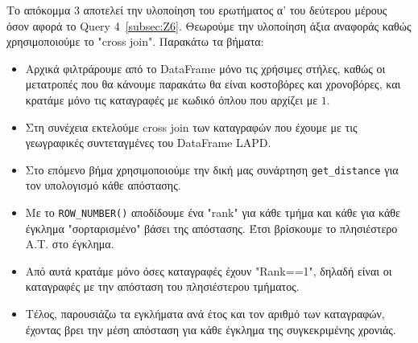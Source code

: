 \documentclass{article}
\begin{document}
Το απόκομμα 3 αποτελεί την υλοποίηση του ερωτήματος α' του δεύτερου μέρους όσον αφορά το Query 4~\ref{subsec:Z6}.  Θεωρούμε την υλοποίηση άξια αναφοράς καθώς χρησιμοποιούμε το  "cross join". Παρακάτω τα βήματα:
\begin{itemize}
    \item   Αρχικά φιλτράρουμε από το  DataFrame μόνο τις χρήσιμες στήλες, καθώς οι μετατροπές που θα κάνουμε παρακάτω θα είναι κοστοβόρες και χρονοβόρες, και κρατάμε μόνο τις καταγραφές με κωδικό όπλου που αρχίζει με $1$.
    \item   Στη συνέχεια εκτελούμε  cross join  των καταγραφών που έχουμε με τις γεωγραφικές συντεταγμένες του  DataFrame LAPD. 
    \item   {}Στο επόμενο βήμα χρησιμοποιούμε την δική μας συνάρτηση \texttt{get\_distance}  για τον υπολογισμό κάθε απόστασης.
    \item   Με το \texttt{ROW\_NUMBER()}  αποδίδουμε ένα "rank" για κάθε τμήμα και κάθε για κάθε έγκλημα "σορταρισμένο" βάσει της απόστασης. Έτσι βρίσκουμε το πλησιέστερο Α.Τ. στο έγκλημα. 
    \item   Από αυτά κρατάμε μόνο όσες καταγραφές έχουν "Rank==1", δηλαδή είναι οι καταγραφές με την απόσταση του πλησιέστερου τμήματος.
    \item   Τέλος, παρουσιάζω τα εγκλήματα ανά έτος και τον αριθμό των καταγραφών, έχοντας βρει την μέση απόσταση για κάθε έγκλημα της συγκεκριμένης χρονιάς. 
\end{itemize}
\end{document}
